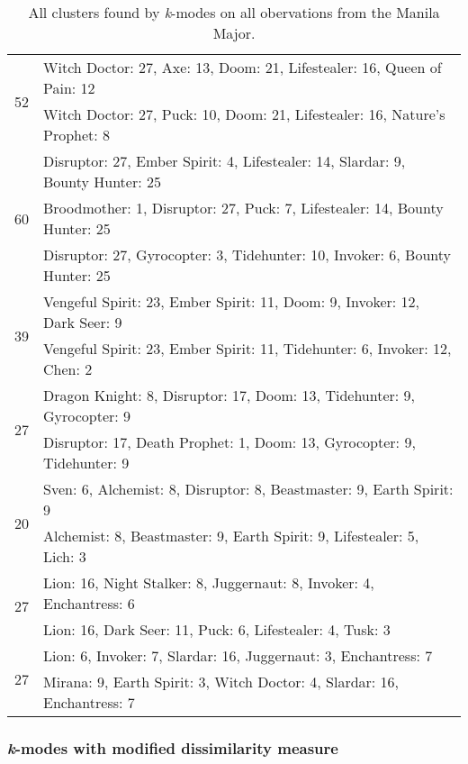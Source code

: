 \documentclass[result.tex]{subfiles}
\begin{document}
\begin{table}[H]
\begin{tabular}{ | c | p{12.5cm} | }
    \multirow{2}{*}{52}
    & Witch Doctor: 27, Axe: 13, Doom: 21, Lifestealer: 16, Queen of Pain: 12 \\
    & Witch Doctor: 27, Puck: 10, Doom: 21, Lifestealer: 16, Nature's Prophet: 8 \\
    \hline
    \multirow{3}{*}{60}
    & Disruptor: 27, Ember Spirit: 4, Lifestealer: 14, Slardar: 9, Bounty Hunter: 25 \\
    & Broodmother: 1, Disruptor: 27, Puck: 7, Lifestealer: 14, Bounty Hunter: 25 \\
    & Disruptor: 27, Gyrocopter: 3, Tidehunter: 10, Invoker: 6, Bounty Hunter: 25 \\
    \hline
    \multirow{2}{*}{39}
    & Vengeful Spirit: 23, Ember Spirit: 11, Doom: 9, Invoker: 12, Dark Seer: 9 \\
    & Vengeful Spirit: 23, Ember Spirit: 11, Tidehunter: 6, Invoker: 12, Chen: 2 \\
    \hline
    \multirow{2}{*}{27}
    & Dragon Knight: 8, Disruptor: 17, Doom: 13, Tidehunter: 9, Gyrocopter: 9 \\
    & Disruptor: 17, Death Prophet: 1, Doom: 13, Gyrocopter: 9, Tidehunter: 9 \\
    \hline
    \multirow{2}{*}{20}
    & Sven: 6, Alchemist: 8, Disruptor: 8, Beastmaster: 9, Earth Spirit: 9 \\
    & Alchemist: 8, Beastmaster: 9, Earth Spirit: 9, Lifestealer: 5, Lich: 3 \\
    \hline
    \multirow{2}{*}{27}
    & Lion: 16, Night Stalker: 8, Juggernaut: 8, Invoker: 4, Enchantress: 6 \\
    & Lion: 16, Dark Seer: 11, Puck: 6, Lifestealer: 4, Tusk: 3 \\
    \hline
    \multirow{2}{*}{27}
    & Lion: 6, Invoker: 7, Slardar: 16, Juggernaut: 3, Enchantress: 7 \\
    & Mirana: 9, Earth Spirit: 3, Witch Doctor: 4, Slardar: 16, Enchantress: 7 \\
    \hline
  \end{tabular}
  \caption{All clusters found by \textit{k}-modes on all obervations from the Manila Major.}
  \label{tab:cl_app_manila_kmodes}
\end{table}

\newpage

\subsubsection*{\textit{k}-modes with modified dissimilarity measure}
\end{document}
